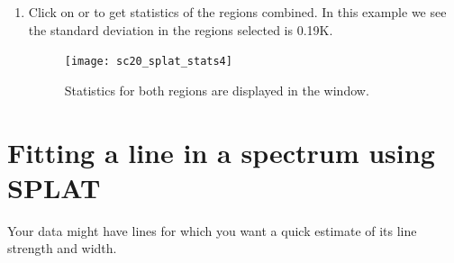 \documentclass[11pt,oneside,chapters]{starlink}
\begin{document}
\begin{enumerate}[label=(\textbf{\arabic*})]
\item Click on  or 
to get statistics of the regions combined. In this example we see the
standard deviation in the regions selected is 0.19K.

\begin{figure}[h!]
\begin{center}
\texttt{[image: sc20\_splat\_stats4]}
\caption[statistics for both regions.]{\label{fig:splat_stats4}
  Statistics for both regions are displayed in the  window. }
\end{center}
\end{figure}


\end{enumerate}


\section{Fitting a line in a spectrum using SPLAT}
\label{sec:splat-fit}

Your data might have lines for which you want a quick estimate of its
line strength and width.
\end{document}
